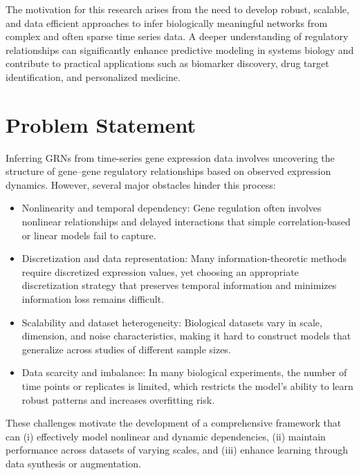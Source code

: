 The motivation for this research arises from the need to develop robust, scalable, and data efficient approaches to infer biologically meaningful networks from complex and often sparse time series data. A deeper understanding of regulatory relationships can significantly enhance predictive modeling in systems biology and contribute to practical applications such as biomarker discovery, drug target identification, and personalized medicine.


\section{Problem Statement}

Inferring GRNs from time-series gene expression data involves uncovering the structure of gene–gene regulatory relationships based on observed expression dynamics. However, several major obstacles hinder this process:
\begin{itemize}
\item Nonlinearity and temporal dependency: Gene regulation often involves nonlinear relationships and delayed interactions that simple correlation-based or linear models fail to capture.

\item Discretization and data representation: Many information-theoretic methods require discretized expression values, yet choosing an appropriate discretization strategy that preserves temporal information and minimizes information loss remains difficult.

\item Scalability and dataset heterogeneity: Biological datasets vary in scale, dimension, and noise characteristics, making it hard to construct models that generalize across studies of different sample sizes.

\item Data scarcity and imbalance: In many biological experiments, the number of time points or replicates is limited, which restricts the model’s ability to learn robust patterns and increases overfitting risk.
\end{itemize}
These challenges motivate the development of a comprehensive framework that can (i) effectively model nonlinear and dynamic dependencies, (ii) maintain performance across datasets of varying scales, and (iii) enhance learning through data synthesis or augmentation.

